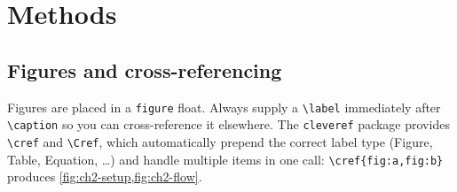 %

\chapter{Methods}
\clearpage

\section{Figures and cross-referencing}

Figures are placed in a \texttt{figure} float.
Always supply a \verb|\label| immediately after \verb|\caption| so
you can cross-reference it elsewhere.
The \texttt{cleveref} package provides \verb|\cref| and \verb|\Cref|,
which automatically prepend the correct label type (Figure, Table,
Equation, \ldots) and handle multiple items in one call:
\verb|\cref{fig:a,fig:b}| produces \cref{fig:ch2-setup,fig:ch2-flow}.

